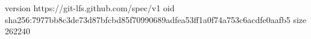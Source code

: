 version https://git-lfs.github.com/spec/v1
oid sha256:7977bb8c3de73d87bfcbd85f70990689adfea53ff1a0f74a753c6acdfe0aafb5
size 262240

